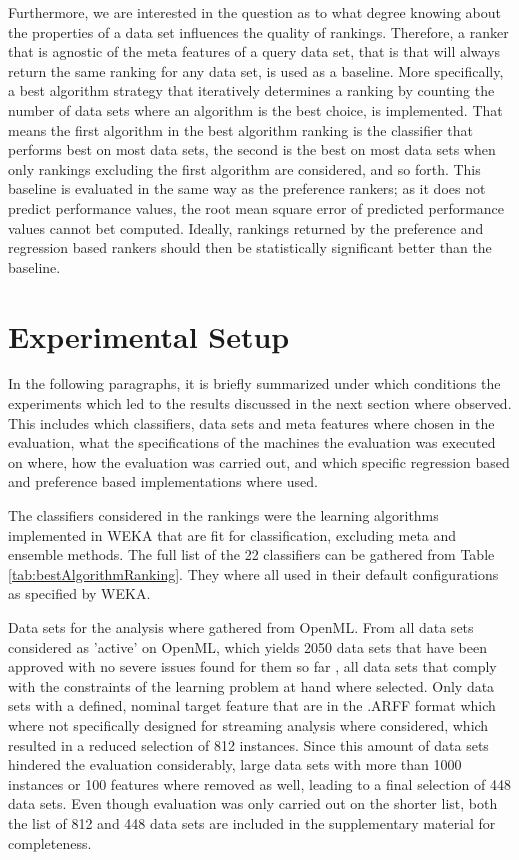 Furthermore, we are interested in the question as to what degree knowing about the properties of a data set influences the quality of rankings. Therefore, a ranker that is agnostic of the meta features of a query data set, that is that will always return the same ranking for any data set, is used as a baseline. More specifically, a best algorithm strategy that iteratively determines a ranking by counting the number of data sets where an algorithm is the best choice, is implemented. That means the first algorithm in the best algorithm ranking is the classifier that performs best on most data sets, the second is the best on most data sets when only rankings excluding the first algorithm are considered, and so forth. This baseline is evaluated in the same way as the preference rankers; as it does not predict performance values, the root mean square error of predicted performance values cannot bet computed. Ideally, rankings returned by the preference and regression based rankers should then be statistically significant better than the baseline. 

\section{Experimental Setup}
In the following paragraphs, it is briefly summarized under which conditions the experiments which led to the results discussed in the next section where observed. This includes which classifiers, data sets and meta features where chosen in the evaluation, what the specifications of the machines the evaluation was executed on where, how the evaluation was carried out, and which specific regression based and preference based implementations where used.

The classifiers considered in the rankings were the learning algorithms implemented in WEKA that are fit for classification, excluding meta and ensemble methods. The full list of the 22 classifiers can be gathered from Table \ref{tab:bestAlgorithmRanking}. They where all used in their default configurations as specified by WEKA. 

Data sets for the analysis where gathered from OpenML. From all data sets considered as 'active' on OpenML, which yields 2050 data sets that have been approved with no severe issues found for them so far \cite{openMLGuide}, all data sets that comply with the constraints of the learning problem at hand where selected. Only data sets with a defined, nominal target feature that are in the .ARFF format which where not specifically designed for streaming analysis\footnotemark{} where considered, which resulted in a reduced selection of 812 instances. Since this amount of data sets hindered the evaluation considerably, large data sets with more than 1000 instances or 100 features where removed as well, leading to a final selection of 448 data sets. Even though evaluation was only carried out on the shorter list, both the list of 812 and 448 data sets are included in the supplementary material for completeness.

